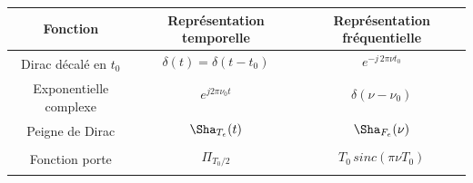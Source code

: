 \begin{center}
\begin{tabular}{|c|c|c|}
\hline
\textbf{Fonction} & \textbf{Représentation temporelle} & \textbf{Représentation fréquentielle} \\ 
\hline
\multirow{2}{*}{Dirac décalé en $t_0$ } & $\delta(t)=\delta(t-t_0)$ & $e^{-j\,2\pi\nu t_0}$ \\
&  
& \\
\hline
\multirow{2}{*}{Exponentielle complexe} & $e^{j2\pi \nu_0 t}$ & $\delta(\nu-\nu_0)$ \\
&  
& \\
\hline
\multirow{2}{*}{Peigne de Dirac} & $\Sha_{T_e}(t)$ & $\Sha_{F_e}(\nu)$ \\
&  
& \\
\hline
\multirow{2}{*}{Fonction porte} & $\Pi_{T_0/2}$ & $ T_0\,sinc(\pi\nu T_0)$ \\
&  
& \\
\hline
\end{tabular}
\end{center}

\endgroup
